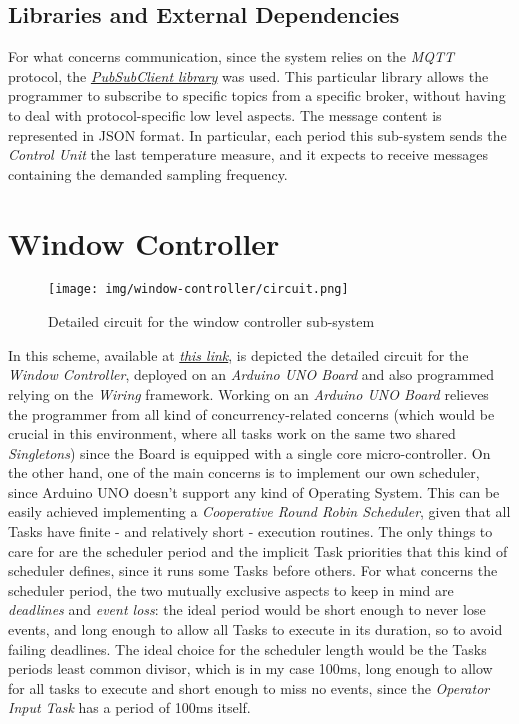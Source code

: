 \documentclass[a4paper,12pt]{report}
\begin{document}
	\subsection{Libraries and External Dependencies}
	For what concerns communication, since the system relies on the \textit{MQTT} protocol, the \href{https://pubsubclient.knolleary.net/}{\textit{PubSubClient library}} was used. This particular library allows the programmer to subscribe to specific topics from a specific broker, without having to deal with protocol-specific low level aspects. The message content is represented in JSON format. In particular, each period this sub-system sends the \textit{Control Unit} the last temperature measure, and it expects to receive messages containing the demanded sampling frequency.
	\section{Window Controller}
	\begin{figure}[H]
		\centering{}
		\texttt{[image: img/window-controller/circuit.png]}
		\caption{Detailed circuit for the window controller sub-system}
		\label{img:window-controller/circuit}
	\end{figure}
	In this scheme, available at \href{https://www.tinkercad.com/things/2nadVXk0wQ5-esiot-assignment-03-arduino?sharecode=t4LayAw_Rc1SNLqdSHt3uK_EuT6TttEPHQjHAwEp-Zc}{\textit{this link}}, is depicted the detailed circuit for the \textit{Window Controller}, deployed on an \textit{Arduino UNO Board} and also programmed relying on the \textit{Wiring} framework.
	\newline Working on an \textit{Arduino UNO Board} relieves the programmer from all kind of concurrency-related concerns (which would be crucial in this environment, where all tasks work on the same two shared \textit{Singletons}) since the Board is equipped with a single core micro-controller.
	\newline On the other hand, one of the main concerns is to implement our own scheduler, since Arduino UNO doesn't support any kind of Operating System. This can be easily achieved implementing a \textit{Cooperative Round Robin Scheduler}, given that all Tasks have finite - and relatively short - execution routines. The only things to care for are the scheduler period and the implicit Task priorities that this kind of scheduler defines, since it runs some Tasks before others.
	\newline For what concerns the scheduler period, the two mutually exclusive aspects to keep in mind are \textit{deadlines} and \textit{event loss}: the ideal period would be short enough to never lose events, and long enough to allow all Tasks to execute in its duration, so to avoid failing deadlines. The ideal choice for the scheduler length would be the Tasks periods least common divisor, which is in my case 100ms, long enough to allow for all tasks to execute and short enough to miss no events, since the \textit{Operator Input Task} has a period of 100ms itself.
\end{document}
